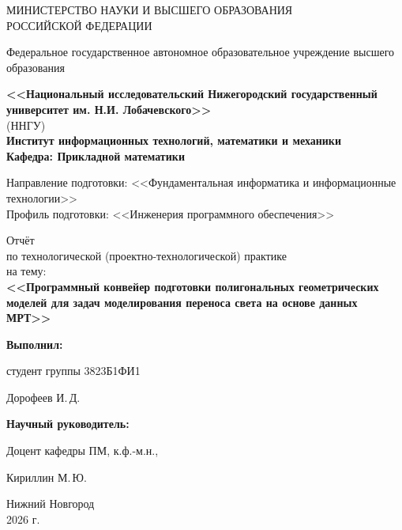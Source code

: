 \begin{titlepage}
	\begin{center}
		\large
		{МИНИСТЕРСТВО НАУКИ И ВЫСШЕГО ОБРАЗОВАНИЯ\\ РОССИЙСКОЙ ФЕДЕРАЦИИ}
		
		Федеральное государственное автономное образовательное учреждение высшего образования
		\vspace{0.5cm}
		
		\textbf{<<Национальный исследовательский Нижегородский государственный университет им. Н.И. Лобачевского>>}\\
		(ННГУ)\\
		\vspace{1cm}
		\textbf{Институт информационных технологий, математики и механики}\\
		\vspace{0.5cm}
		\textbf{Кафедра: Прикладной математики}
		\vspace{1cm}
		
		Направление подготовки: <<Фундаментальная информатика и информационные технологии>>\\
		Профиль подготовки: <<Инженерия программного обеспечения>>
		\vfill
		
		\vfill
		
		\Large
		Отчёт \\
		\normalsize
        по технологической (проектно-технологической) практике \\
		на тему:\\
		\Large
		\textbf{<<Программный конвейер подготовки полигональных геометрических моделей для задач моделирования переноса света на основе данных МРТ>>}
		{\LARGE 
		}
		\bigskip
		
		
	\end{center}
	\vfill
	
	\hfill\begin{minipage}{0.4\textwidth}
		\textbf{Выполнил:} 

            студент группы 3823Б1ФИ1 

            \underline{\hspace{3cm}} Дорофеев И.\,Д. \bigskip

	\end{minipage}%
	
	\hfill\begin{minipage}{0.4\textwidth}
		\textbf{Научный руководитель:}
  
		Доцент кафедры ПМ, к.ф.-м.н.,
        
		\underline{\hspace{3cm}}  Кириллин М.\,Ю.

	\end{minipage}
	\vfill
	
	\begin{center}
		Нижний Новгород\\
		2026 г.
	\end{center}
\end{titlepage}
\thispagestyle{empty} %